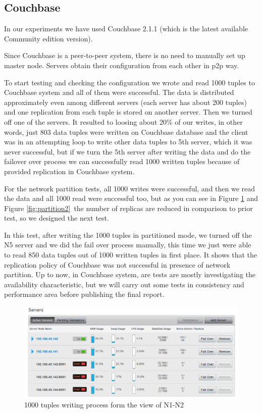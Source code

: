 \documentclass[a4paper]{article}
\begin{document}
\subsection{Couchbase}

In our experiments we have used Couchbase 2.1.1 (which is the latest available Community edition version).

Since Couchbase is a peer-to-peer system, there is no need to manually set up master node. Servers obtain their configuration from each other in p2p way.

To start testing and checking the configuration we wrote and read 1000 tuples to Couchbase system and all of them were successful. 
The data is distributed approximately even among different servers (each server has about 200 tuples) and one replication from each tuple is stored on another server. 
Then we turned off one of the servers. It resulted to loosing about 20\% of our writes, in other words, just 803 data tuples were written on Couchbase database and the client was in an attempting loop to write other data tuples to 5th server, which it was never successful, but if we turn the 5th server after writing the data and do the failover over process we can successfully read 1000 written tuples because of provided replication in Couchbase system.

For the network partition tests, all 1000 writes were successful, and then we read the data and all 1000 read were successful too, but as you can see in Figure \ref{fig:partition1} and Figure \ref{fig:partition2}\, the number of replicas are reduced in comparison to prior test, so we designed the next test.

In this test, after writing the 1000 tuples in partitioned mode, we turned off the N5 server and we did the fail over process manually, this time we just were able to read 850 data tuples out of 1000 written tuples in first place. It shows that the replication policy of Couchbase was not successful in presence of network partition. 
Up to now, in Couchbase system, are tests are mostly investigating the availability characteristic, but we will carry out some tests in consistency and performance area before publishing the final report.

\begin{figure}[H]
	\centering
	\includegraphics[width=\textwidth]{partition1}
	\caption{1000 tuples writing process form the view of N1-N2}
	\label{fig:partition1}
\end{figure}
\end{document}
